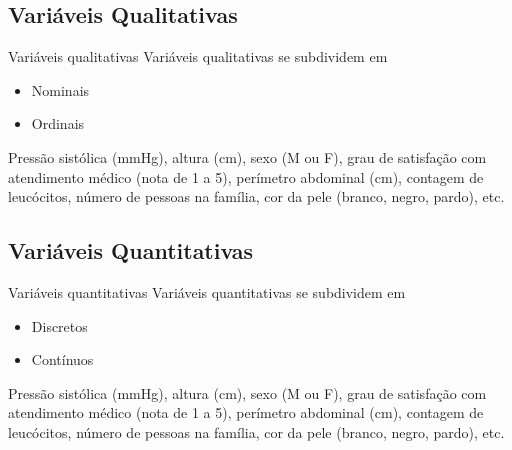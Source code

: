 \documentclass{beamer}
\begin{document}
\subsection{Variáveis Qualitativas}

\begin{frame}{Variáveis qualitativas}
Variáveis qualitativas se subdividem em
  \begin{itemize}
  \item<1-2> Nominais

  \item<3-4> Ordinais
  \end{itemize}


  \begin{example}
    Pressão sistólica (mmHg), altura (cm), \alert{sexo (M ou
      F)}, \alert{grau de satisfação com atendimento médico
      (nota de 1 a 5)}, perímetro abdominal (cm), contagem de
    leucócitos, número de pessoas na família, \alert{cor da
      pele (branco, negro, pardo)}, etc.
  \end{example}

\end{frame}

\subsection{Variáveis Quantitativas}

\begin{frame}{Variáveis quantitativas}
Variáveis quantitativas se subdividem em
  \begin{itemize}
  \item<1-2> Discretos
  \item<3-4> Contínuos
  \end{itemize}
  \begin{example}
    \alert{Pressão sistólica (mmHg)}, \alert{altura
      (cm)}, sexo (M ou F), grau de satisfação com atendimento médico
    (nota de 1 a 5), perímetro abdominal (cm), \alert{contagem
      de leucócitos}, \alert{número de pessoas na família},
    cor da pele (branco, negro, pardo), etc.
  \end{example}
\end{frame}
\end{document}
